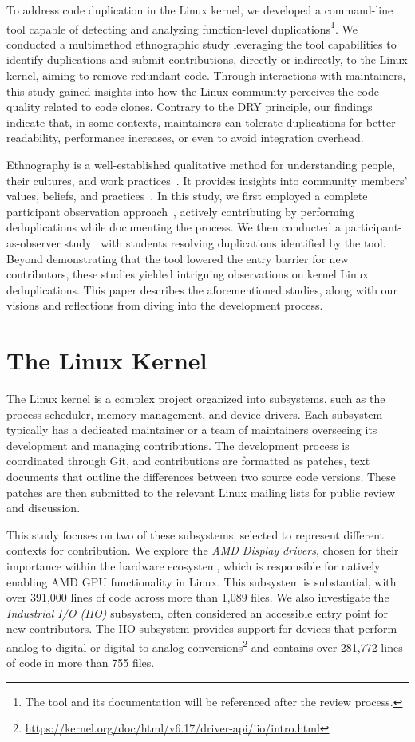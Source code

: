 \documentclass[10pt,conference]{IEEEtran}
\begin{document}
To address code duplication in the Linux kernel, we developed a command-line tool capable of detecting and analyzing function-level duplications\footnote{The tool and its documentation will be referenced after the review process.}. We conducted a multimethod ethnographic study leveraging the tool capabilities to identify duplications and submit contributions, directly or indirectly, to the Linux kernel, aiming to remove redundant code.
%
Through interactions with maintainers, this study gained insights into how the Linux community perceives the code quality related to code clones. Contrary to the DRY principle, our findings indicate that, in some contexts, maintainers can tolerate duplications for better readability, performance increases, or even to avoid integration overhead.

Ethnography is a well-established qualitative method for understanding people, their cultures, and work practices~\cite{bookethno}. It provides insights into community members' values, beliefs, and practices~\cite{ethnosoft}. In this study, we first employed a complete participant observation approach~\cite{gold1958roles}, actively contributing by performing deduplications while documenting the process. We then conducted a participant-as-observer study~\cite{gold1958roles} with students resolving duplications identified by the tool. Beyond demonstrating that the tool lowered the entry barrier for new contributors, these studies yielded intriguing observations on kernel Linux deduplications. This paper describes the aforementioned studies, along with our visions and reflections from diving into the development process.

\section{The Linux Kernel}

The Linux kernel is a complex project organized into subsystems, such as the process scheduler, memory management, and device drivers. Each subsystem typically has a dedicated maintainer or a team of maintainers overseeing its development and managing contributions. The development process is coordinated through Git, and contributions are formatted as patches, text documents that outline the differences between two source code versions. These patches are then submitted to the relevant Linux mailing lists for public review and discussion.

This study focuses on two of these subsystems, selected to represent different contexts for contribution. We explore the \textit{AMD Display drivers}, chosen for their importance within the hardware ecosystem, which is responsible for natively enabling AMD GPU functionality in Linux. This subsystem is substantial, with over 391,000 lines of code across more than 1,089 files. We also investigate the \textit{Industrial I/O (IIO)} subsystem, often considered an accessible entry point for new contributors. The IIO subsystem provides support for devices that perform analog-to-digital or digital-to-analog conversions\footnote{\href{https://kernel.org/doc/html/v6.17/driver-api/iio/intro.html}{https://kernel.org/doc/html/v6.17/driver-api/iio/intro.html}} and contains over 281,772 lines of code in more than 755 files.
\end{document}
